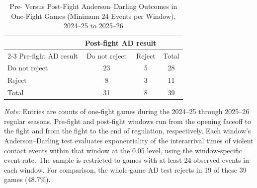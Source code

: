 \begin{table}[htbp]
\centering
\caption{Pre- Versus Post-Fight Anderson--Darling Outcomes in One-Fight Games (Minimum 24 Events per Window), 2024--25 to 2025--26}
\label{tab:one_fight_AD_rejection_min_24_20242025_20252026}
\small
\renewcommand{\arraystretch}{1.15}
\setlength{\tabcolsep}{6pt}

\begin{tabular*}{0.78\textwidth}{@{\extracolsep{\fill}}lccc}
\toprule
 & \multicolumn{2}{c}{Post-fight AD result} & \\
\cmidrule(lr){2-3}
Pre-fight AD result & Do not reject & Reject & Total \\
\midrule
Do not reject & 23 & 5 & 28 \\
Reject & 8 & 3 & 11 \\
\midrule
Total & 31 & 8 & 39 \\
\bottomrule
\end{tabular*}

\vspace{0.4em}
\parbox{0.78\textwidth}{
\footnotesize
\textit{Note:} Entries are counts of one-fight games during the 2024--25 through 2025--26 regular seasons. Pre-fight and post-fight windows run from the opening faceoff to the fight and from the fight to the end of regulation, respectively. Each window's Anderson--Darling test evaluates exponentiality of the interarrival times of violent contact events within that window at the 0.05 level, using the window-specific event rate. The sample is restricted to games with at least 24 observed events in each window. For comparison, the whole-game AD test rejects in 19 of these 39 games (48.7\%).
}
\end{table}
